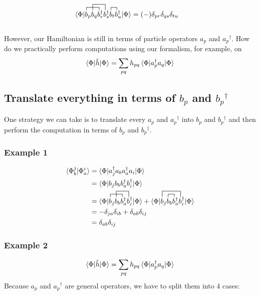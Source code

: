 \documentclass{article}
\newcommand{\fctr}{\contraction}
\newcommand{\dg}{\ensuremath{^\dagger} }
\begin{document}
\begin{align*}
\braket{\Phi| \fctr{}{b}{{}_p b_q}{b}
\fctr[2ex]{ b_p}{b}{{}_q b_r\dg}{b}
 b_p b_q b_r\dg b_s\dg \fctr{}{b}{{}_t}{b}b_t b_u\dg |\Phi} &= (-) \delta_{pr} \delta_{qs} \delta_{tu} 
\end{align*}
\\
However, our Hamiltonian is still in terms of particle operators $a_p$ and $a_p\dg$. 
How do we practically perform computations using our formalism, for example, on 
\[\braket{\Phi | \hat{h} |\Phi} = \sum_{pq} h_{pq} \braket{\Phi |a_p\dg a_q |\Phi} \]
\subsection{Translate everything in terms of $b_p$ and $b_p\dg$ }
One strategy we can take is to translate every $a_p$ and $a_p\dg$ into $b_p$ and $b_p\dg$ and then perform the computation in terms of 
$b_p$ and $b_p\dg$. 
\subsubsection{Example 1} 
\begin{align*}
 \braket{\Phi_b^j | \Phi_a^i} &= \braket{\Phi | a_j\dg a_b a_a\dg a_i |  \Phi} \\
 &= \braket{\Phi | b_j b_b b_a\dg b_i\dg |  \Phi}   \\
 &= \braket{\Phi | \fctr{}{b}{{}_j b_b}{b} b_j \fctr[2ex]{}{b}{{}_b b_a\dg}{b}b_b b_a\dg b_i\dg |  \Phi}   + \braket{\Phi | \fctr[2ex]{}{b}{{}_j b_b b_a\dg }{b} b_j \fctr{}{b}{{}_b}{b}b_b b_a\dg b_i\dg |  \Phi}  \\
 &= -\delta_{ja}\delta_{ib} + \delta_{ab} \delta_{ij} \\
 &= \delta_{ab} \delta_{ij}
\end{align*}

\subsubsection{Example 2} 
\[\braket{\Phi | \hat{h} |\Phi} = \sum_{pq} h_{pq} \braket{\Phi |a_p\dg a_q |\Phi} \]
Because $a_p$ and $a_p\dg$ are general operators, we have to split them into 4 cases: 
\end{document}
